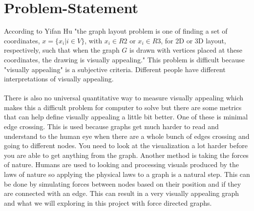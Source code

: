 \newpage
\section{Problem-Statement}
According to Yifan Hu "the graph layout problem is one of finding a set of coordinates, $x = \{x_i | i \in V\}$,
with $x_i \in R2$ or $x_i \in R3$, for 2D or 3D layout, respectively, such that when the
graph $G$ is drawn with vertices placed at these coordinates, the drawing is visually
appealing." \cite{hu2005efficient} This problem is difficult because "visually appealing" is a subjective criteria. Different people have different interpretations of visually appealing. \\\\There is also no universal quantitative way to measure visually appealing which makes this a difficult problem for computer to solve but there are some metrics that can help define visually appealing a little bit better. One of these is minimal edge crossing. This is used because graphs get much harder to read and understand to the human eye when there are a whole bunch of edges crossing and going to different nodes. You need to look at the visualization a lot harder before you are able to get anything from the graph. Another method is taking the forces of nature. Humans are used to looking and processing visuals produced by the laws of nature so applying the physical laws to a graph is a natural step. This can be done by simulating forces between nodes based on their position and if they are connected with an edge. This can result in a very visually appealing graph and what we will exploring in this project with force directed graphs. 